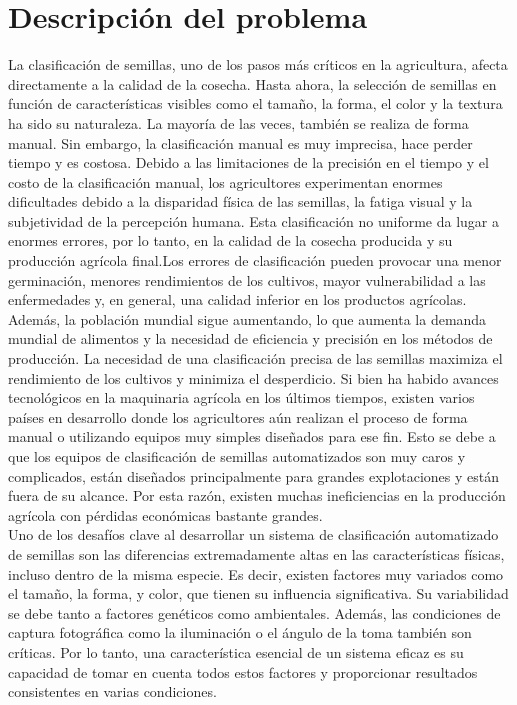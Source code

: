 \section{Descripción del problema}
La clasificación de semillas, uno de los pasos más críticos en la agricultura, afecta directamente a la calidad de la cosecha. Hasta ahora, la selección de semillas en función de características visibles como el tamaño, la forma, el color y la textura ha sido su naturaleza. La mayoría de las veces, también se realiza de forma manual. Sin embargo, la clasificación manual es muy imprecisa, hace perder tiempo y es costosa. Debido a las limitaciones de la precisión en el tiempo y el costo de la clasificación manual, los agricultores experimentan enormes dificultades debido a la disparidad física de las semillas, la fatiga visual y la subjetividad de la percepción humana. Esta clasificación no uniforme da lugar a enormes errores, por lo tanto, en la calidad de la cosecha producida y su producción agrícola final.Los errores de clasificación pueden provocar una menor germinación, menores rendimientos de los cultivos, mayor vulnerabilidad a las enfermedades y, en general, una calidad inferior en los productos agrícolas.
\\
Además, la población mundial sigue aumentando, lo que aumenta la demanda mundial de alimentos y la necesidad de eficiencia y precisión en los métodos de producción. La necesidad de una clasificación precisa de las semillas maximiza el rendimiento de los cultivos y minimiza el desperdicio. Si bien ha habido avances tecnológicos en la maquinaria agrícola en los últimos tiempos, existen varios países en desarrollo donde los agricultores aún realizan el proceso de forma manual o utilizando equipos muy simples diseñados para ese fin. Esto se debe a que los equipos de clasificación de semillas automatizados son muy caros y complicados, están diseñados principalmente para grandes explotaciones y están fuera de su alcance. Por esta razón, existen muchas ineficiencias en la producción agrícola con pérdidas económicas bastante grandes.
\\Uno de los desafíos clave al desarrollar un sistema de clasificación automatizado de semillas son las diferencias extremadamente altas en las características físicas, incluso dentro de la misma especie. Es decir, existen factores muy variados como el tamaño, la forma, y color, que tienen su influencia significativa. Su variabilidad se debe tanto a factores genéticos como ambientales. Además, las condiciones de captura fotográfica como la iluminación o el ángulo de la toma también son críticas. Por lo tanto, una característica esencial de un sistema eficaz es su capacidad de tomar en cuenta todos estos factores y proporcionar resultados consistentes en varias condiciones.
